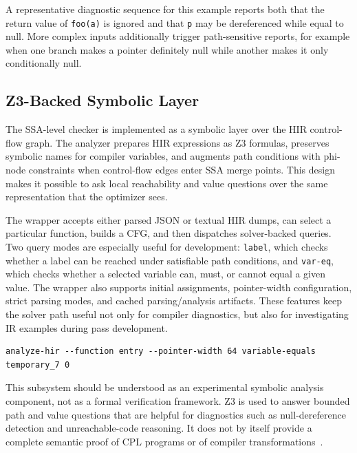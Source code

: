 \documentclass[10pt,twocolumn]{article}
\begin{document}
\par A representative diagnostic sequence for this example reports both that the return value of \texttt{foo(a)} is ignored and that \texttt{p} may be dereferenced while equal to null. More complex inputs additionally trigger path-sensitive reports, for example when one branch makes a pointer definitely null while another makes it only conditionally null.

\subsection{Z3-Backed Symbolic Layer}
\par The SSA-level checker is implemented as a symbolic layer over the HIR control-flow graph. The analyzer prepares HIR expressions as Z3 formulas, preserves symbolic names for compiler variables, and augments path conditions with phi-node constraints when control-flow edges enter SSA merge points. This design makes it possible to ask local reachability and value questions over the same representation that the optimizer sees.
\par The wrapper accepts either parsed JSON or textual HIR dumps, can select a particular function, builds a CFG, and then dispatches solver-backed queries. Two query modes are especially useful for development: \texttt{label}, which checks whether a label can be reached under satisfiable path conditions, and \texttt{var-eq}, which checks whether a selected variable can, must, or cannot equal a given value. The wrapper also supports initial assignments, pointer-width configuration, strict parsing modes, and cached parsing/analysis artifacts. These features keep the solver path useful not only for compiler diagnostics, but also for investigating IR examples during pass development.

\begin{lstlisting}[caption={Representative interface to the symbolic query layer.}]
analyze-hir --function entry --pointer-width 64 variable-equals temporary_7 0
\end{lstlisting}

\par This subsystem should be understood as an experimental symbolic analysis component, not as a formal verification framework. Z3 is used to answer bounded path and value questions that are helpful for diagnostics such as null-dereference detection and unreachable-code reasoning. It does not by itself provide a complete semantic proof of CPL programs or of compiler transformations~\cite{deMoura2008z3}.
\end{document}
